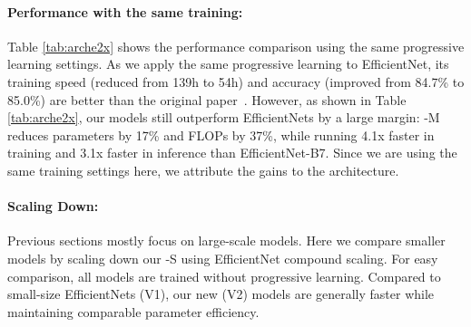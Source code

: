 \documentclass{article}
\begin{document}
\paragraph{Performance with the same training:}  Table \ref{tab:arche2x} shows the performance comparison using the same progressive learning settings. As we apply the same progressive learning to EfficientNet, its training speed (reduced from 139h to 54h) and accuracy (improved from 84.7\% to 85.0\%) are better than the original paper~\cite{efficientnet19}. However, as shown in Table \ref{tab:arche2x}, our {\xnet} models still outperform EfficientNets by a large margin: {\xnet}-M reduces parameters by 17\% and FLOPs by 37\%, while running 4.1x faster in training and 3.1x faster in inference than EfficientNet-B7. Since we are using the same training settings here, we attribute the gains to the {\xnet} architecture.

\begin{table}[h]
    \vskip -0.1in
    \caption{
        Comparison with the same training settings -- 
Our new {\xnet}-M runs faster with less parameters.
       }
    \centering
    \label{tab:arche2x}
    \vskip -0.1in
\end{table} 
\paragraph{Scaling Down:} Previous sections mostly focus on large-scale models. Here we compare smaller models by scaling down our {\xnet}-S using EfficientNet compound scaling. For easy comparison, all models are trained without progressive learning. Compared to small-size EfficientNets (V1), our new {\xnet} (V2) models are generally faster while maintaining comparable parameter efficiency. 
\end{document}
